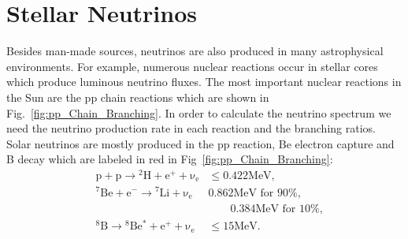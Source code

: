 \section{Stellar Neutrinos}


Besides man-made sources, neutrinos are also produced in many astrophysical environments. %
For example, numerous nuclear reactions occur in stellar cores which produce luminous neutrino fluxes. %
The most important nuclear reactions in the Sun are the pp chain reactions which are shown in Fig.~\ref{fig:pp_Chain_Branching}. In order to calculate the neutrino spectrum we need the neutrino production rate in each reaction and the branching ratios. Solar neutrinos are mostly produced in the pp reaction, Be electron capture and B decay which are labeled in red in Fig~\ref{fig:pp_Chain_Branching}:
\begin{align*}
&\mathrm{p+p\to {}^2H + e^+ +\nu_e}  & \mathrm{\leq 0.422MeV},\\
&\mathrm{{}^7Be + e^- \to {}^7Li + \nu_e} &\text{0.862MeV for 90\%},\\
&&\qquad \text{0.384MeV for 10\%}, \\
&\mathrm{{}^8B \to {}^8Be^* +e^+ +\nu_e}  & \mathrm{\leq 15 MeV}.
\end{align*}




